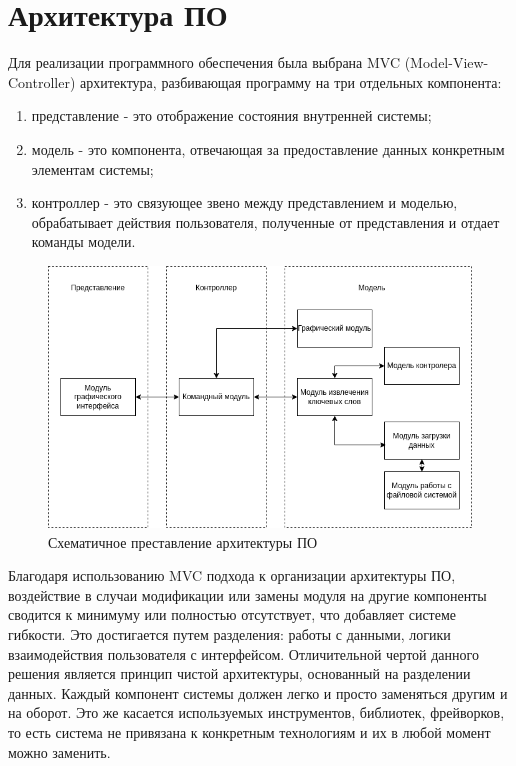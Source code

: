 \section{Архитектура ПО}
Для реализации программного обеспечения была выбрана MVC (Model-View-Controller) архитектура, разбивающая программу на три отдельных компонента:
\begin{enumerate}
	\item представление - это отображение состояния внутренней системы;
	\item модель - это компонента, отвечающая за предоставление данных конкретным элементам системы;
	\item контроллер - это связующее звено между представлением и моделью, обрабатывает действия пользователя, полученные от представления и отдает команды модели.
\end{enumerate}
\begin{figure}[!h]
	\centering
	\includegraphics[width=1\linewidth]{src/img/design/mvc.drawio}
	\caption{Схематичное преставление архитектуры ПО}
	\label{fig:mvc}
\end{figure}

Благодаря использованию MVC подхода к организации архитектуры ПО, воздействие в случаи модификации или замены модуля на другие компоненты сводится к минимуму или полностью отсутствует, что добавляет системе гибкости.
Это достигается путем разделения: работы с данными, логики взаимодействия пользователя с интерфейсом.
Отличительной чертой данного решения является принцип чистой архитектуры, основанный на разделении данных.
Каждый компонент системы должен легко и просто заменяться другим и на оборот.
Это же касается используемых инструментов, библиотек, фрейворков, то есть система не привязана к конкретным технологиям и их в любой момент можно заменить.

